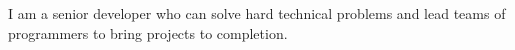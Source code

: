 

\begin{cvparagraph}

I am a senior developer who can solve hard technical problems and lead teams of programmers to bring projects to completion.
\end{cvparagraph}
